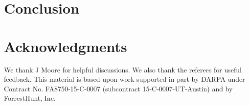 \documentclass[submission,copyright,creativecommons]{eptcs}
\begin{document}
\section{Conclusion}
\label{sec:conclusion}


\section*{Acknowledgments}

We thank J Moore for helpful discussions.
We also thank the referees for useful feedback.
This material is based upon work supported in part by DARPA under
Contract No. FA8750-15-C-0007 (subcontract 15-C-0007-UT-Austin)
and by ForrestHunt, Inc.



\end{document}
